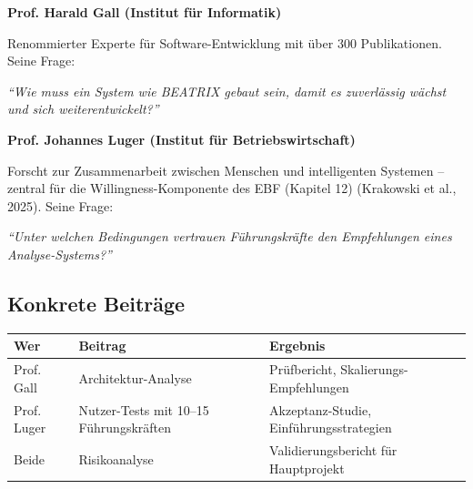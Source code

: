 \documentclass[11pt,a4paper]{article}
\begin{document}
\textbf{Prof. Harald Gall (Institut für Informatik)}

Renommierter Experte für Software-Entwicklung mit über 300 Publikationen. Seine Frage:

\textit{``Wie muss ein System wie BEATRIX gebaut sein, damit es zuverlässig wächst und sich weiterentwickelt?''}

\textbf{Prof. Johannes Luger (Institut für Betriebswirtschaft)}

Forscht zur Zusammenarbeit zwischen Menschen und intelligenten Systemen -- zentral für die Willingness-Komponente des EBF (Kapitel 12) (Krakowski et al., 2025). Seine Frage:

\textit{``Unter welchen Bedingungen vertrauen Führungskräfte den Empfehlungen eines Analyse-Systems?''}

\subsection{Konkrete Beiträge}

\begin{table}[h]
\centering
\begin{tabular}{@{}L{3cm}L{5cm}L{5cm}@{}}
\toprule
\textbf{Wer} & \textbf{Beitrag} & \textbf{Ergebnis} \\
\midrule
Prof. Gall & Architektur-Analyse & Prüfbericht, Skalierungs-Empfehlungen \\
Prof. Luger & Nutzer-Tests mit 10--15 Führungskräften & Akzeptanz-Studie, Einführungsstrategien \\
Beide & Risikoanalyse & Validierungsbericht für Hauptprojekt \\
\bottomrule
\end{tabular}
\end{table}

\vspace{1cm}
\end{document}
